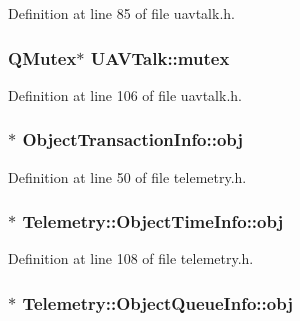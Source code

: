 Definition at line 85 of file uavtalk.\-h.

\hypertarget{group___u_a_v_talk_plugin_ga2dea39cdabf26ef85d0b26583e21e60b}{
\subsubsection[{mutex}]{\setlength{\rightskip}{0pt plus 5cm}Q\-Mutex$\ast$ U\-A\-V\-Talk\-::mutex\hspace{0.3cm}{\ttfamily [protected]}}}\label{group___u_a_v_talk_plugin_ga2dea39cdabf26ef85d0b26583e21e60b}


Definition at line 106 of file uavtalk.\-h.

\hypertarget{group___u_a_v_talk_plugin_ga9ad43239e470da9249f214e43521bddb}{
\subsubsection[{obj}]{$\ast$ Object\-Transaction\-Info\-::obj}}\label{group___u_a_v_talk_plugin_ga9ad43239e470da9249f214e43521bddb}


Definition at line 50 of file telemetry.\-h.

\hypertarget{group___u_a_v_talk_plugin_ga5dc98fd0fc9c63da03a2468969adb919}{
\subsubsection[{obj}]{$\ast$ Telemetry\-::\-Object\-Time\-Info\-::obj}}\label{group___u_a_v_talk_plugin_ga5dc98fd0fc9c63da03a2468969adb919}


Definition at line 108 of file telemetry.\-h.

\hypertarget{group___u_a_v_talk_plugin_ga467e2ec75abb2e4535cac1d8cc872692}{
\subsubsection[{obj}]{$\ast$ Telemetry\-::\-Object\-Queue\-Info\-::obj}}\label{group___u_a_v_talk_plugin_ga467e2ec75abb2e4535cac1d8cc872692}


